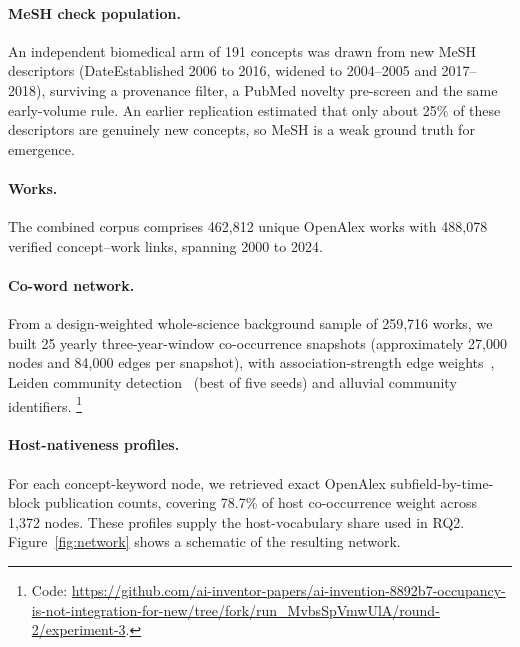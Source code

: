 \documentclass[11pt,letterpaper]{article}
\begin{document}
\paragraph{MeSH check population.} An independent biomedical arm of 191 concepts was drawn from new MeSH
descriptors (DateEstablished 2006 to 2016, widened to 2004--2005 and 2017--2018), surviving a provenance
filter, a PubMed novelty pre-screen and the same early-volume rule. An earlier replication estimated that only about 25\% of these
descriptors are genuinely new concepts, so MeSH is a weak ground truth for emergence.

\paragraph{Works.} The combined corpus comprises 462,812 unique OpenAlex works with 488,078 verified
concept--work links, spanning 2000 to 2024.

\paragraph{Co-word network.} From a design-weighted whole-science background sample of 259,716 works, we
built 25 yearly three-year-window co-occurrence snapshots (approximately 27,000 nodes and 84,000 edges per
snapshot), with association-strength edge weights~\citep{vanEck2009}, Leiden community
detection~\citep{Traag2018} (best of five seeds) and alluvial community identifiers.%
\footnote{Code: \url{https://github.com/ai-inventor-papers/ai-invention-8892b7-occupancy-is-not-integration-for-new/tree/fork/run_MvbsSpVmwUlA/round-2/experiment-3}.}

\paragraph{Host-nativeness profiles.} For each concept-keyword node, we retrieved exact OpenAlex
subfield-by-time-block publication counts, covering 78.7\% of host co-occurrence weight across 1,372 nodes.
These profiles supply the host-vocabulary share used in RQ2. Figure~\ref{fig:network} shows a schematic of the
resulting network.
\end{document}
